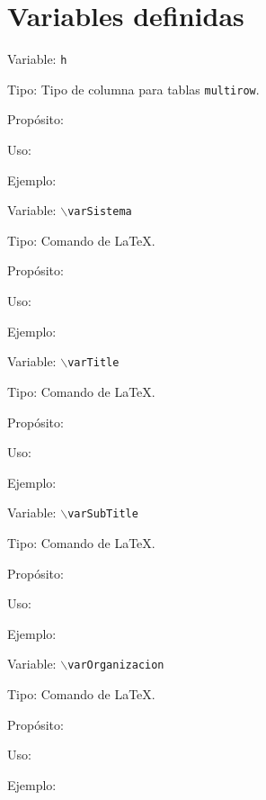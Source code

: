 \section{Variables definidas}

\begin{Cdescription}
	\item[Variable:] {\tt h}
	\item[Tipo:] Tipo de columna para tablas {\tt multirow}.
	\item[Propósito:]
	\item[Uso:]
	\item[Ejemplo:]
\end{Cdescription}

\begin{Cdescription}
	\item[Variable:] {\tt $\backslash$varSistema}
	\item[Tipo:] Comando de \LaTeX.
	\item[Propósito:]
	\item[Uso:]
	\item[Ejemplo:]
\end{Cdescription}

\begin{Cdescription}
	\item[Variable:] {\tt $\backslash$varTitle}
	\item[Tipo:] Comando de \LaTeX.
	\item[Propósito:]
	\item[Uso:]
	\item[Ejemplo:]
\end{Cdescription}

\begin{Cdescription}
	\item[Variable:] {\tt $\backslash$varSubTitle}
	\item[Tipo:] Comando de \LaTeX.
	\item[Propósito:]
	\item[Uso:]
	\item[Ejemplo:]
\end{Cdescription}

\begin{Cdescription}
	\item[Variable:] {\tt $\backslash$varOrganizacion}
	\item[Tipo:] Comando de \LaTeX.
	\item[Propósito:]
	\item[Uso:]
	\item[Ejemplo:]
\end{Cdescription}

